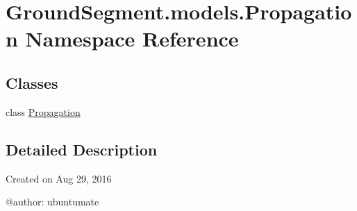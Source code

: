 \hypertarget{namespace_ground_segment_1_1models_1_1_propagation}{}\section{Ground\+Segment.\+models.\+Propagation Namespace Reference}
\label{namespace_ground_segment_1_1models_1_1_propagation}
\subsection*{Classes}
\begin{DoxyCompactItemize}
\item 
class \hyperlink{class_ground_segment_1_1models_1_1_propagation_1_1_propagation}{Propagation}
\end{DoxyCompactItemize}


\subsection{Detailed Description}
\begin{DoxyVerb}Created on Aug 29, 2016

@author: ubuntumate
\end{DoxyVerb}
 